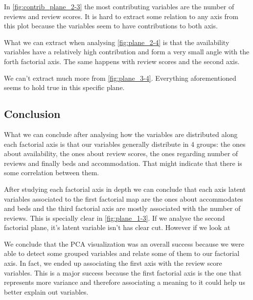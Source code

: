 

In \cref{fig:contrib_plane_2-3} the most contributing variables are the number of reviews and review scores. It is hard to extract some relation to any axis
from this plot because the variables seem to have contributions to both axis.




What we can extract when analysing \cref{fig:plane_2-4} is that the availability variables have 
a relatively high contribution and form a very small angle with the forth factorial axis. The same happens with review scores and the second axis.



We can't extract much more from \cref{fig:plane_3-4}. Everything
aforementioned seems to hold true in this specific plane.


\begin{landscape}


\end{landscape}

\subsection{Conclusion}%
What we can conclude after analysing how the variables are distributed along each factorial axis is 
that our variables generally distribute in 4 groups: the ones about availability, 
the ones about review scores, the ones regarding number of reviews and finally beds and accommodation. That might indicate that there is some correlation between them.

After studying each factorial axis in depth we can conclude that each axis
latent variables associated to the first factorial map are the ones about accommodates and beds and the third factorial axis are mostly associated with 
the number of reviews. This is specially clear in \cref{fig:plane_1-3}. If we analyse the second factorial plane, it's latent variable isn't has clear cut.
However if we look at 


We conclude that the PCA visualization was an overall success because we were able to detect some grouped
variables and relate some of them to our factorial axis. In fact, we ended up associating the first axis
with the review score variables. This is a major success because the first factorial axis is the one
that represents more variance and therefore associating a meaning to it could help us better explain
out variables.


